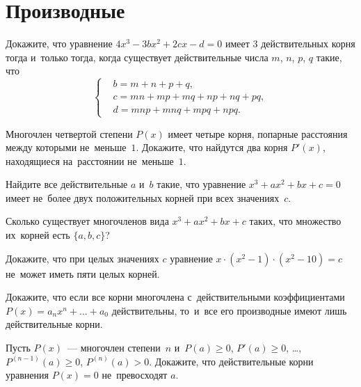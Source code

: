 
\section*{Производные}


\begin{problems}

\item
Докажите, что уравнение $4 x^3 - 3 b x^2 + 2 c x - d = 0$ имеет 3
действительных корня тогда и~только тогда, когда существует действительные
числа $m$, $n$, $p$, $q$ такие, что
\[ \left\{ \begin{aligned} &
    b = m + n + p + q
, \\ &
    c = m n + m p + m q + n p + n q + p q
, \\ &
    d = m n p + m n q + m p q + n p q
.\end{aligned} \right. \]

\item
Многочлен четвертой степени $P(x)$ имеет четыре корня, попарные расстояния
между которыми не~меньше~$1$.
Докажите, что найдутся два корня $P'(x)$, находящиеся на~расстоянии
не~меньше~$1$.

\item
Найдите все действительные $a$ и~$b$ такие, что уравнение
$x^3 + a x^2 + b x + c = 0$ имеет не~более двух положительных корней при всех
значениях~$c$.

\item
Сколько существует многочленов вида $x^3 + a x^2 + b x + c$ таких, что
множество их~корней есть $\{ a, b, c \}$?

\item
Докажите, что при целых значениях $c$ уравнение
$x \cdot (x^2 - 1) \cdot (x^2 - 10) = c$ не~может иметь пяти целых корней.

\item
Докажите, что если все корни многочлена с~действительными коэффициентами
$P(x) = a_{n} x^{n} + \ldots + a_{0}$ действительны, то~и~все его производные имеют
лишь действительные корни.

\item
Пусть $P(x)$~--- многочлен степени~$n$
и~$P(a) \geq 0$, $P'(a) \geq 0$, \ldots,
$P^{(n-1)}(a) \geq 0$, $P^{(n)}(a) > 0$.
Докажите, что действительные корни уравнения $P(x) = 0$ не~превосходят $a$.


\end{problems}
